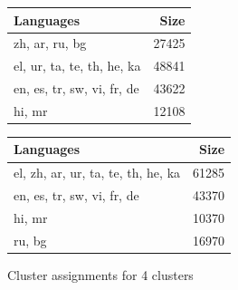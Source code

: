 \begin{figure}[p]
    \centering
    
    \begin{subtable}{0.49\textwidth}
        \centering
        \begin{tabular}{lr}
            \toprule
            Languages & Size \\
            \midrule
            zh, ar, ru, bg & 27425 \\
            el, ur, ta, te, th, he, ka & 48841 \\
            en, es, tr, sw, vi, fr, de & 43622 \\
            hi, mr & 12108 \\
            \bottomrule
        \end{tabular}
        \caption{\citet{chung_improving_2020}}
        \label{tab:chung_clusters_k4}
        

    \end{subtable}
    \hfill
    \begin{subtable}{0.49\textwidth}
        \centering
        \begin{tabular}{lr}
        \toprule
        Languages & Size \\
        \midrule
        el, zh, ar, ur, ta, te, th, he, ka & 61285 \\
        en, es, tr, sw, vi, fr, de & 43370 \\
        hi, mr & 10370 \\
        ru, bg & 16970 \\
        \bottomrule
        \end{tabular}
        \caption{\citet{liang_xlm-v_2023}}
        \label{tab:liang_clusters_k4}
    \end{subtable}

    \caption{Cluster assignments for 4 clusters}
    \label{fig:cluster_assignments_k4}
\end{figure}

